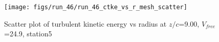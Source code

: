 \begin{figure}[H]
\centering
\texttt{[image: figs/run\_46/run\_46\_ctke\_vs\_r\_mesh\_scatter]}
\caption{Scatter plot of turbulent kinetic energy vs radius at $z/c$=9.00, $V_{free}$=24.9, station5}
\label{fig:run_46_ctke_vs_r_mesh_scatter}
\end{figure}


